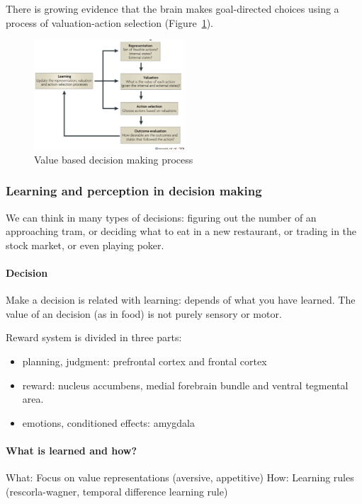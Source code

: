 \documentclass[12pt,article,oneside,a4paper]{memoir}
\begin{document}
There is growing evidence that the brain makes goal-directed choices using a
process of valuation-action selection (Figure~\ref{fig:decision-making}).

\begin{figure}
  \centering
  \includegraphics[width=0.5\textwidth]{imgs/value-based-decision-making.png}
  \caption{Value based decision making process}
  \label{fig:decision-making}
\end{figure}

\subsubsection{Learning and perception in decision making}
We can think in many types of decisions: figuring out the number of an
approaching tram, or deciding what to eat in a new restaurant, or trading in
the stock market, or even playing poker.

\paragraph{Decision}
Make a decision is related with learning: depends of what you have learned.
The value of an decision (as in food) is not purely sensory or motor.

Reward system is divided in three parts:
\begin{itemize}
\item planning, judgment: prefrontal cortex and frontal cortex
\item reward: nucleus accumbens, medial forebrain bundle and ventral tegmental
area.
\item emotions, conditioned effects: amygdala
\end{itemize}

\paragraph{What is learned and how?}
What: Focus on value representations (aversive, appetitive)
How: Learning rules (rescorla-wagner, temporal difference learning rule)
\end{document}
